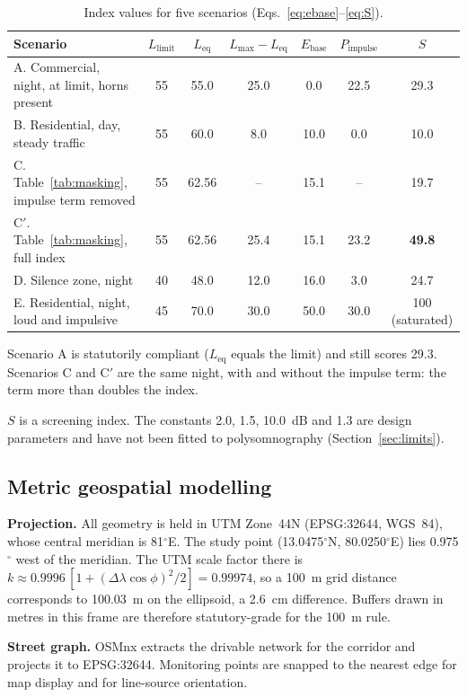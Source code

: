 \documentclass[conference]{IEEEtran}
\newcommand{\Leq}{L_{\text{eq}}}
\newcommand{\Lmax}{L_{\max}}
\newcommand{\Lbase}{E_{\text{base}}}
\newcommand{\Pimp}{P_{\text{impulse}}}
\begin{document}
\begin{table}[!t]
\caption{Index values for five scenarios (Eqs.~\eqref{eq:ebase}--\eqref{eq:S}).}
\label{tab:scen}
\centering
\small
\renewcommand{\arraystretch}{1.15}
\begin{tabular}{@{}lcccccc@{}}
\toprule
Scenario & $L_{\text{limit}}$ & $\Leq$ & $\Lmax-\Leq$ & $\Lbase$ & $\Pimp$ & $S$ \\
\midrule
A. Commercial, night, at limit, horns present & 55 & 55.0 & 25.0 & 0.0 & 22.5 & 29.3 \\
B. Residential, day, steady traffic & 55 & 60.0 & 8.0 & 10.0 & 0.0 & 10.0 \\
C. Table~\ref{tab:masking}, impulse term removed & 55 & 62.56 & -- & 15.1 & -- & 19.7 \\
C$'$. Table~\ref{tab:masking}, full index & 55 & 62.56 & 25.4 & 15.1 & 23.2 & \textbf{49.8} \\
D. Silence zone, night & 40 & 48.0 & 12.0 & 16.0 & 3.0 & 24.7 \\
E. Residential, night, loud and impulsive & 45 & 70.0 & 30.0 & 50.0 & 30.0 & 100 (saturated) \\
\bottomrule
\end{tabular}
\end{table}

Scenario A is statutorily compliant ($\Leq$ equals the limit) and still scores 29.3. Scenarios C and C$'$ are the same night, with and without the impulse term: the term more than doubles the index.

$S$ is a screening index. The constants 2.0, 1.5, 10.0~dB and 1.3 are design parameters and have not been fitted to polysomnography (Section~\ref{sec:limits}).

\subsection{Metric geospatial modelling}

\textbf{Projection.} All geometry is held in UTM Zone~44N (EPSG:32644, WGS~84), whose central meridian is 81$^\circ$E. The study point (13.0475$^\circ$N, 80.0250$^\circ$E) lies 0.975$^\circ$ west of the meridian. The UTM scale factor there is $k \approx 0.9996\,[1+(\Delta\lambda\cos\phi)^2/2] = 0.99974$, so a 100~m grid distance corresponds to 100.03~m on the ellipsoid, a 2.6~cm difference. Buffers drawn in metres in this frame are therefore statutory-grade for the 100~m rule.

\textbf{Street graph.} OSMnx \cite{osmnx} extracts the drivable network for the corridor and projects it to EPSG:32644. Monitoring points are snapped to the nearest edge for map display and for line-source orientation.
\end{document}
